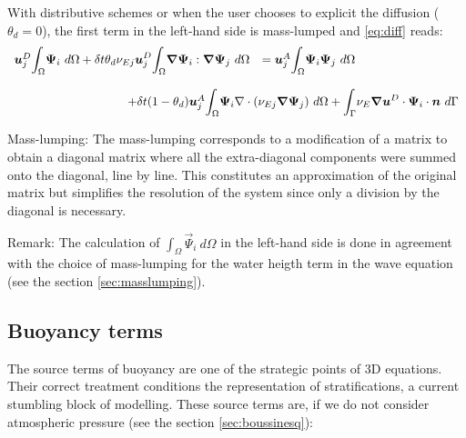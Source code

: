 With distributive schemes or when the user chooses to explicit the
diffusion ($\theta_d=0$), the first term in the left-hand side is mass-lumped
and \eqref{eq:diff} reads:
\begin{equation}
\begin{array}{ll}
\vec{u}_j^D\displaystyle{\int_\Omega}\vec{\Psi}_i~d\Omega +
\delta t \theta_d\nu_{Ej}\vec{u}_j^D\displaystyle{\int_\Omega}\Grad\vec{\Psi}_i
:\Grad\vec{\Psi}_j~d\Omega & = \vec{u}_j^A\displaystyle{\int_\Omega}
\vec{\Psi}_i\vec{\Psi}_j~d\Omega \bigskip \\
& ~\hspace{-4cm}+\delta t (1-\theta_d)\vec{u}_j^A\displaystyle{\int_\Omega}
\vec{\Psi}_i\Div(\nu_{Ej}\Grad\vec{\Psi}_j)~d\Omega
+\displaystyle{\int_\Gamma}\nu_{E}\Grad\vec{u}^D\cdot\vec{\Psi}_i\cdot\vec{n}
~d\Gamma
\end{array}
\end{equation}

\begin{CommentBlock}{Mass-lumping:}
The mass-lumping corresponds to a modification of a matrix
to obtain a diagonal matrix where all the extra-diagonal components
were summed onto the diagonal, line by line. This constitutes
an approximation of the original matrix but simplifies the
resolution of the system since only a division by the diagonal is
necessary.
\end{CommentBlock}

\begin{CommentBlock}{Remark:}
The calculation of $\displaystyle{\int_\Omega}\vec{\Psi}_i~d\Omega$ in the
left-hand side is done in agreement with the choice of mass-lumping for
the water heigth term in the wave equation (see the section
\ref{sec:masslumping}).
\end{CommentBlock}

\subsection{\label{calcul flottabilite 3D}Buoyancy terms%
%
}

The source terms of buoyancy are one of the strategic points of 3D equations.
Their correct treatment conditions the representation of stratifications, a
current stumbling block of modelling. These source terms are, if we do not
consider atmospheric pressure (see the section \ref{sec:boussinesq}):%

